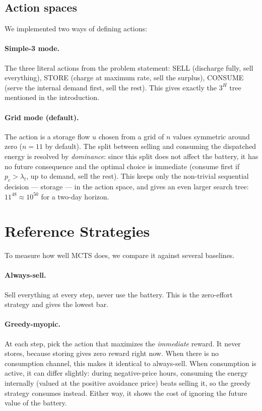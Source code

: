 \documentclass[12pt,a4paper]{article}
\begin{document}
\subsection{Action spaces}

We implemented two ways of defining actions:

\paragraph{Simple-3 mode.} The three literal actions from the problem
statement: SELL (discharge fully, sell everything), STORE (charge at maximum
rate, sell the surplus), CONSUME (serve the internal demand first, sell the
rest). This gives exactly the $3^H$ tree mentioned in the introduction.

\paragraph{Grid mode (default).} The action is a storage flow $u$ chosen from
a grid of $n$ values symmetric around zero ($n = 11$ by default). The split
between selling and consuming the dispatched energy is resolved by
\emph{dominance}: since this split does not affect the battery, it has no
future consequence and the optimal choice is immediate (consume first if
$p_c > \lambda_t$, up to demand, sell the rest). This keeps only the
non-trivial sequential decision — storage — in the action space, and gives an
even larger search tree: $11^{48} \approx 10^{50}$ for a two-day horizon.

\section{Reference Strategies}

To measure how well MCTS does, we compare it against several baselines.

\paragraph{Always-sell.} Sell everything at every step, never use the
battery. This is the zero-effort strategy and gives the lowest bar.

\paragraph{Greedy-myopic.} At each step, pick the action that maximizes the
\emph{immediate} reward. It never stores, because storing gives zero reward
right now. When there is no consumption channel, this makes it identical to
always-sell. When consumption is active, it can differ slightly: during
negative-price hours, consuming the energy internally (valued at the positive
avoidance price) beats selling it, so the greedy strategy consumes instead.
Either way, it shows the cost of ignoring the future value of the battery.
\end{document}
